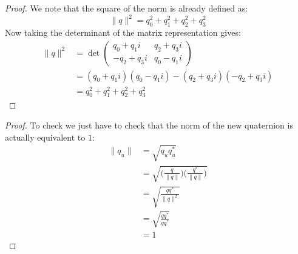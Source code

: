 \documentclass[12pt, letterpaper, onecolumn, conference, final]{IEEEtran}
\theoremstyle{definition}
\newtheorem{definition}{Definition}
\newtheorem{proposition}{Proposition}
\theoremstyle{plain}
\begin{document}
\begin{proof}
We note that the square of the norm is already defined as:
\begin{equation*}
\| q \|^2 = q_0^2 + q_1^2 + q_2^2 + q_3^2
\end{equation*}
Now taking the determinant of the matrix representation gives:
\begin{equation*}
\begin{split}
\| q \|^2 &= \det \begin{pmatrix}
q_0 + q_1i & q_2 + q_3i \\
-q_2 + q_3i & q_0 - q_1i
\end{pmatrix} \\
&= (q_0 + q_1i)(q_0 - q_1i) - (q_2 + q_3i)(-q_2 + q_3i) \\
&= q_0^2 + q_1^2 + q_2^2 + q_3^2
\end{split}
\end{equation*}
\end{proof}

\newpage
\begin{center}
\end{center}

\begin{center}
\end{center}

\begin{proof}
To check we just have to check that the norm of the new quaternion is actually equivalent to $1$:
\begin{equation*}
\begin{split}
\| q_u \| &= \sqrt{q_uq_u^*} \\
&= \sqrt{\Big( \frac{q}{\| q \|} \Big) \Big( \frac{q^*}{\| q \|} \Big)} \\
&= \sqrt{\frac{qq^*}{\| q \|^2}} \\
&= \sqrt{\frac{qq^*}{qq^*}} \\
&= 1
\end{split}
\end{equation*}
\end{proof}
\end{document}
